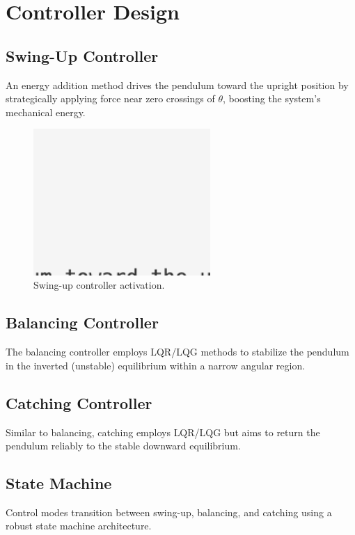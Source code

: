 \documentclass[12pt]{article}
\begin{document}
\section{Controller Design}

\subsection{Swing-Up Controller}
An energy addition method drives the pendulum toward the upright position by strategically applying force near zero crossings of $\theta$, boosting the system's mechanical energy.

\begin{figure}[H]
    \centering
    \includegraphics[width=0.6\textwidth]{figures/ph.png}
    \caption{Swing-up controller activation.}
    \label{fig:swingup}
\end{figure}

\subsection{Balancing Controller}
The balancing controller employs LQR/LQG methods to stabilize the pendulum in the inverted (unstable) equilibrium within a narrow angular region.

\subsection{Catching Controller}
Similar to balancing, catching employs LQR/LQG but aims to return the pendulum reliably to the stable downward equilibrium.

\subsection{State Machine}
Control modes transition between swing-up, balancing, and catching using a robust state machine architecture.
\end{document}
